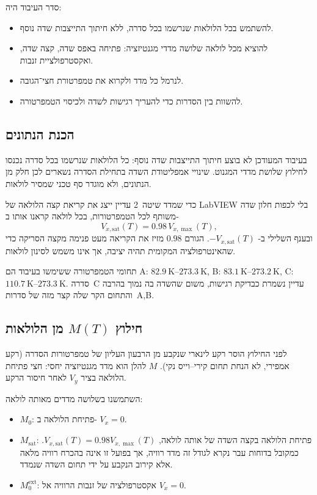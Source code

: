 \documentclass{extarticle}
\begin{document}
סדר העיבוד היה:
\begin{itemize}
\item להשתמש בכל הלולאות שנרשמו בכל סדרה, ללא חיתוך התייצבות שדה נוסף.
\item להוציא מכל לולאה שלושה מדדי מגנטיזציה: פתיחה באפס שדה, קצה שדה, ואקסטרפולציית זנבות.
\item לנרמל כל מדד ולקרוא את טמפרטורת חצי־הגובה.
\item להשוות בין הסדרות כדי להעריך רגישות לשדה ולכיסוי הטמפרטורה.
\end{itemize}

\subsection{הכנת הנתונים}
בעיבוד המעודכן לא בוצע חיתוך התייצבות שדה נוסף: כל הלולאות שנרשמו בכל סדרה נכנסו לחילוץ שלושת מדדי המגנוט. שינויי אמפליטודת השדה בתחילת הסדרה נשארים לכן חלק מן הנתונים, ולא מוגדר סף טכני שמסיר לולאות.

כדי שמדד שיטה~2 עדיין ייצג את קריאת קצה הלולאה של
\textenglish{LabVIEW}
בלי לכפות חלון שדה משותף לכל הטמפרטורות, בכל לולאה קראנו אותו ב-
\begin{equation}
V_{x,\mathrm{sat}}(T)=0.98\,V_{x,\max}(T),
\end{equation}
ובענף השלילי ב-
$-V_{x,\mathrm{sat}}(T)$.
הגורם
$0.98$
מזיז את הקריאה מעט פנימה מקצה הסריקה כדי שהאינטרפולציה המקומית תהיה יציבה, אך אינו משמש לסינון לולאות.

תחומי הטמפרטורה ששימשו בעיבוד הם
\textenglish{A}:
$\SI{82.9}{\kelvin}$--$\SI{273.3}{\kelvin}$,
\textenglish{B}:
$\SI{83.1}{\kelvin}$--$\SI{273.2}{\kelvin}$,
\textenglish{C}:
$\SI{110.7}{\kelvin}$--$\SI{273.3}{\kelvin}$.
סדרה~\textenglish{C}
עדיין נשמרת כבדיקת רגישות, משום שהשדה בה נמוך בהרבה והתחום הקר שלה קצר מזה של סדרות~\textenglish{A,B}.

\subsection{חילוץ \texorpdfstring{
$M(T)$
}{M(T)} מן הלולאות}
לפני החילוץ הוסר רקע לינארי שנקבע מן הרבעון העליון של טמפרטורות הסדרה (רקע אמפירי, לא הנחת תחום קירי--וייס נקי).
$M$
להלן הוא מדד מגנטיזציה יחסי: חצי פתיחת הלולאה בציר
$V_y$
לאחר חיסור הרקע.

השתמשנו בשלושה מדדים מאותה לולאה:
\begin{itemize}
\item
$M_0$:
פתיחת הלולאה ב-
$V_x=0$.
\item
$M_{\mathrm{sat}}$:
פתיחת הלולאה בקצה השדה של אותה לולאה,
$V_{x,\mathrm{sat}}(T)=0.98V_{x,\max}(T)$.
כמקובל בדוחות עבר נקרא לגודל זה מדד רוויה, אך בפועל זו אינה בהכרח רוויה מלאה אלא קירוב הנקבע על ידי תחום השדה שנמדד.
\item
$M_0^{\mathrm{ext}}$:
אקסטרפולציה של זנבות הרוויה אל
$V_x=0$.
\end{itemize}
\end{document}
